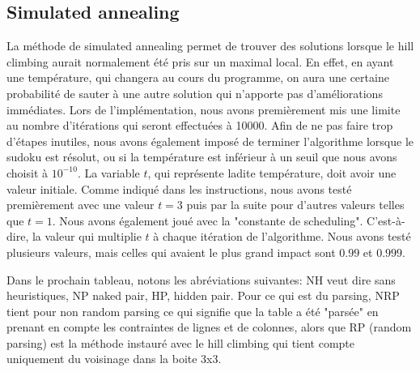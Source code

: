 \documentclass[8pt]{article}
\begin{document}
\subsection{Simulated annealing}
La méthode de simulated annealing permet de trouver des solutions lorsque
le hill climbing aurait normalement été pris sur un maximal local.
En effet, en ayant une température, qui changera au cours du programme,
on aura une certaine probabilité de sauter à une autre solution
qui n'apporte pas d'améliorations immédiates.
Lors de l'implémentation, nous avons premièrement mis une limite
au nombre d'itérations qui seront effectuées à 10000. Afin de ne pas faire
trop d'étapes inutiles, nous avons également imposé de terminer l'algorithme
lorsque le sudoku est résolut, ou si la température est inférieur
à un seuil que nous avons choisit à $10^{-10}$. La variable $t$,
qui représente ladite température, doit avoir une valeur initiale.
Comme indiqué dans les instructions, nous avons testé premièrement
avec une valeur $t=3$ puis par la suite pour d'autres valeurs telles
que $t=1$. Nous avons également joué avec la "constante de scheduling".
C'est-à-dire, la valeur qui multiplie $t$ à chaque itération de l'algorithme.
Nous avons testé plusieurs valeurs, mais celles qui avaient le plus grand impact
sont $0.99$ et $0.999$.

Dans le prochain tableau, notons les abréviations suivantes: NH
veut dire sans heuristiques, NP naked pair, HP, hidden pair. Pour
ce qui est du parsing, NRP tient pour non random parsing ce qui
signifie que la table a été "parsée" en prenant en compte les contraintes de lignes
et de colonnes, alors que RP (random parsing) est la méthode instauré avec le
hill climbing qui tient compte uniquement du voisinage dans la boite 3x3.
\end{document}
